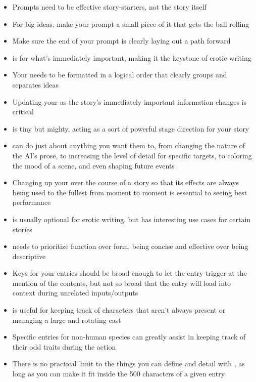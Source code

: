 ﻿\documentclass[Coomer-main.tex]{subfiles}
\begin{document}
\begin{itemize}

\item Prompts need to be effective story-starters, not the story itself
\item For big ideas, make your prompt a small piece of it that gets the ball rolling
\item Make sure the end of your prompt is clearly laying out a path forward

\item \rem is for what's immediately important, making it the keystone of erotic writing
\item Your \rem needs to be formatted in a logical order that clearly groups and separates ideas
\item Updating your \rem as the story's immediately important information changes is critical

\item \an is tiny but mighty, acting as a sort of powerful stage direction for your story
\item \ans can do just about anything you want them to, from changing the nature of the AI's prose, to increasing the level of detail for specific targets, to coloring the mood of a scene, and even shaping future events
\item Changing up your \an over the course of a story so that its effects are always being used to the fullest from moment to moment is essential to seeing best performance

\item \wi is usually optional for erotic writing, but has interesting use cases for certain stories
\item \wi needs to prioritize function over form, being concise and effective over being descriptive
\item Keys for your entries should be broad enough to let the entry trigger at the mention of the contents, but not so broad that the entry will load into context during unrelated inputs/outputs
\item \wi is useful for keeping track of characters that aren't always present or managing a large and rotating cast
\item Specific \wi entries for non-human species can greatly assist in keeping track of their odd traits during the action
\item There is no practical limit to the things you can define and detail with \wi, as long as you can make it fit inside the 500 characters of a given entry


\end{itemize}
\end{document}
